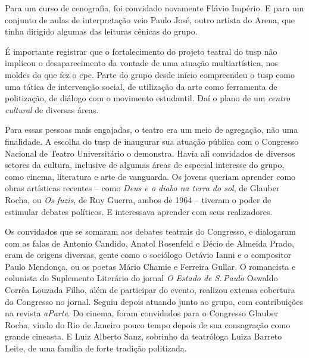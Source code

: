 Para um curso de cenografia, foi convidado novamente Flávio
Império. E para um conjunto de aulas de interpretação veio Paulo
José, outro artista do Arena, que tinha dirigido algumas das leituras
cênicas do grupo.

\subject{Frentes de cinema, literatura, música e comunicação de massa}

É importante registrar que o fortalecimento do projeto teatral do {\sc tusp}
não implicou o desaparecimento da vontade de uma atuação
multiartística, nos moldes do que fez o {\sc cpc}. Parte do grupo desde
início compreendeu o {\sc tusp} como uma tática de intervenção social, de
utilização da arte como ferramenta de politização, de diálogo com o
movimento estudantil. Daí o plano de um {\it centro cultural} de
diversas áreas.

Para essas pessoas mais engajadas, o teatro era um meio de agregação,
não uma finalidade. A escolha do {\sc tusp} de inaugurar sua atuação pública
com o Congresso Nacional de Teatro Universitário o demonstra.
Havia ali convidados de diversos setores da cultura, inclusive de
algumas áreas de especial interesse do grupo, como cinema, literatura e
arte de vanguarda. Os jovens queriam aprender como obras artísticas
recentes -- como {\it Deus e o diabo na terra do sol}, de Glauber Rocha,
ou {\it Os fuzis}, de Ruy Guerra, ambos de 1964 -- tiveram o poder de
estimular debates políticos. E interessava aprender com seus
realizadores.

Os convidados que se somaram aos debates teatrais do Congresso, e
dialogaram com as falas de Antonio Candido, Anatol Rosenfeld e Décio de
Almeida Prado, eram de origens diversas, gente como o
sociólogo Octávio Ianni e o compositor Paulo Mendonça, ou os poetas
Mário Chamie e Ferreira Gullar. O romancista e colunista do Suplemento
Literário do jornal {\it O Estado de S.\,Paulo} Oswaldo Corrêa Louzada
Filho, além de participar do evento, realizou extensa cobertura do
Congresso no jornal. Seguiu depois atuando junto ao grupo, com
contribuições na revista {\it aParte}. Do cinema, foram convidados para
o Congresso Glauber Rocha, vindo do Rio de Janeiro pouco tempo depois de
sua consagração como grande cineasta. E Luiz Alberto Sanz, sobrinho da
teatróloga Luiza Barreto Leite, de uma família de forte tradição
politizada.


